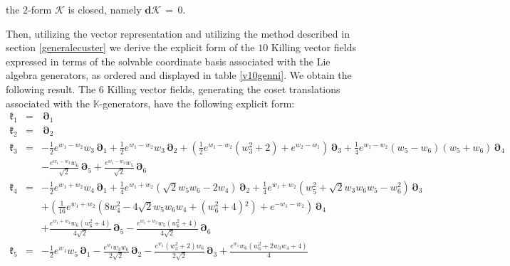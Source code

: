 \documentclass[10pt,a4paper]{article}
\begin{document}
the $2$-form $\boldsymbol{\mathcal{K}}$ is closed, namely $\mathbf{d}\boldsymbol{\mathcal{K}}\, = \, 0$.
\par
Then, utilizing the vector representation and utilizing  the method described in section \ref{generalecuster} we derive the explicit form of the $10$ Killing vector fields expressed in terms of the solvable coordinate basis associated with the Lie algebra generators, as ordered and displayed in table \ref{v10genni}. We obtain the following result. The $6$ Killing vector fields, generating the coset translations associated with the $\mathbb{K}$-generators, have the following explicit form:
\begin{eqnarray}
\label{KillvetK}
  \boldsymbol{\mathfrak{k}}_1 &=& \, \boldsymbol{\partial}_1 \nonumber \\
  \boldsymbol{\mathfrak{k}}_2 &=& \, \boldsymbol{\partial}_2  \nonumber \\
  \boldsymbol{\mathfrak{k}}_3 &=& -\frac{1}{2} e^{w_1-w_2} w_3 \, \boldsymbol{\partial}_1+\frac{1}{2} e^{w_1-w_2} w_3
   \, \boldsymbol{\partial}_2+\left(\frac{1}{2} e^{w_1-w_2} \left(w_3^2+2\right)+e^{w_2-w_1}\right)
   \, \boldsymbol{\partial}_3+\frac{1}{4} e^{w_1-w_2} \left(w_5-w_6\right) \left(w_5+w_6\right)
   \, \boldsymbol{\partial}_4\nonumber \\
   &&-\frac{e^{w_1-w_2} w_6 }{\sqrt{2}}\, \boldsymbol{\partial}_5 +\frac{e^{w_1-w_2} w_5
   }{\sqrt{2}} \, \boldsymbol{\partial}_6 \nonumber \\
  \boldsymbol{\mathfrak{k}}_4 &=& -\frac{1}{2} e^{w_1+w_2} w_4 \, \boldsymbol{\partial}_1+\frac{1}{4} e^{w_1+w_2} \left(\sqrt{2} w_5
   w_6-2 w_4\right) \, \boldsymbol{\partial}_2+\frac{1}{4} e^{w_1+w_2} \left(w_5^2+\sqrt{2} w_3 w_6
   w_5-w_6^2\right) \, \boldsymbol{\partial}_3 \nonumber\\
   &&+\left(\frac{1}{16} e^{w_1+w_2} \left(8 w_4^2-4 \sqrt{2}
   w_5 w_6 w_4+\left(w_6^2+4\right){}^2\right)+e^{-w_1-w_2}\right)
   \, \boldsymbol{\partial}_4 \nonumber \\
   &&+\frac{e^{w_1+w_2} w_6 \left(w_6^2+4\right) }{4
   \sqrt{2}}\, \boldsymbol{\partial}_5-\frac{e^{w_1+w_2} w_5 \left(w_6^2+4\right) }{4 \sqrt{2}}\, \boldsymbol{\partial}_6 \nonumber\\
  \boldsymbol{\mathfrak{k}}_5 &=& -\frac{1}{2} e^{w_1} w_5 \, \boldsymbol{\partial}_1
  -\frac{e^{w_1} w_3 w_6 }{2
   \sqrt{2}}\, \boldsymbol{\partial}_2-\frac{e^{w_1} \left(w_3^2+2\right) w_6 }{2
   \sqrt{2}}\, \boldsymbol{\partial}_3+\frac{e^{w_1} w_6 \left(w_6^2+2 w_3 w_4+4\right) }{4
}
\end{eqnarray}
\end{document}
